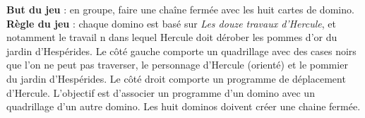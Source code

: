 \Recreation

   
   {\bf But du jeu} : en groupe, faire une chaîne fermée avec les huit cartes de domino. \\
   {\bf Règle du jeu} : chaque domino est basé sur {\it Les douze travaux d'Hercule}, et notamment le travail n dans lequel Hercule doit dérober les pommes d'or du jardin d'Hespérides. Le côté gauche comporte un quadrillage avec des cases noirs que l'on ne peut pas traverser, le personnage d'Hercule (orienté) et le pommier du jardin d'Hespérides. Le côté droit comporte un programme de déplacement d'Hercule. L'objectif est d'associer un programme d'un domino avec un quadrillage d'un autre domino. Les huit dominos doivent créer une chaine fermée. \\
